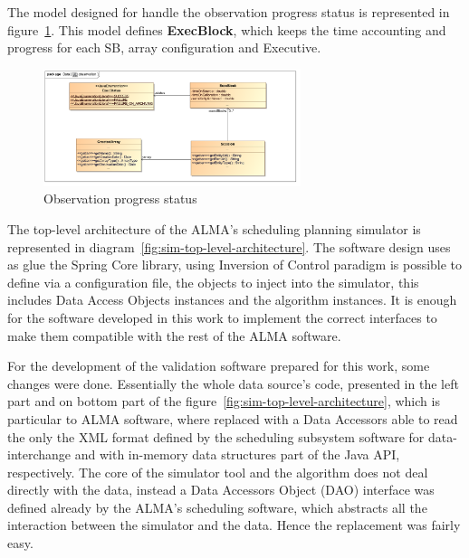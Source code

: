 The model designed for handle the observation progress status is represented in figure~\ref{fig:datamodel-observation}. This model defines \textbf{ExecBlock}, which keeps the time accounting and progress for each SB, array configuration and Executive. 

\begin{figure}[htbp]	
\begin{center}
\includegraphics[width=0.67\textwidth]{images/Observation}
\end{center}
\caption{Observation progress status}
\label{fig:datamodel-observation}
\end{figure}

The top-level architecture of the ALMA's scheduling planning simulator is represented in diagram~\ref{fig:sim-top-level-architecture}. The software design uses as glue the Spring Core library, using Inversion of Control paradigm is possible to define via a configuration file, the objects to inject into the simulator, this includes Data Access Objects instances and the algorithm instances. It is enough for the software developed in this work to implement the correct interfaces to make them compatible with the rest of the ALMA software.

For the development of the validation software prepared for this work, some changes were done. Essentially the whole data source's code, presented in the left part and on bottom part of the figure~\ref{fig:sim-top-level-architecture}, which is particular to ALMA software, where replaced with a Data Accessors able to read the only the XML format defined by the scheduling subsystem software for data-interchange and with in-memory data structures part of the Java API, respectively. The core of the simulator tool and the algorithm does not deal directly with the data, instead a Data Accessors Object (DAO) interface was defined already by the ALMA's scheduling software, which abstracts all the interaction between the simulator and the data. Hence the replacement was fairly easy.

